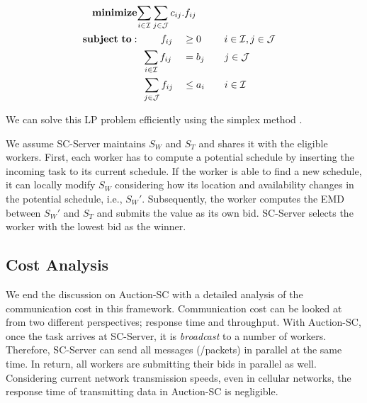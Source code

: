 \setcounter{equation}{0}
\begin{alignat}{2}
\mathbf{minimize}&\mathrlap{\sum_{i \in \mathcal{I}} \sum_{j \in \mathcal{J}} c_{ij}.f_{ij}} \notag\\
\mathbf{subject\ to:}&\phantom{{a}={a}} f_{ij} && \geq 0 \ \quad\quad i \in \mathcal{I}, j \in \mathcal{J}\\
&\phantom{{a}}\sum_{i \in \mathcal{I}} f_{ij} &&= b_j \quad\quad j \in \mathcal{J}\\
&\phantom{{a}}\sum_{j \in \mathcal{J}} f_{ij} &&\leq a_i \quad\quad i \in \mathcal{I}
\end{alignat}



\noindent We can solve this LP problem efficiently using the simplex method \cite{Dantzig90}.

We assume SC-Server maintains $S_W$ and $S_T$ and shares it with the eligible workers. First, each worker has to compute a potential schedule by inserting the incoming task to its current schedule. If the worker is able to find a new schedule, it can locally modify $S_W$ considering how its location and availability changes in the potential schedule, i.e., $S_{W}'$. Subsequently, the worker computes the EMD between $S_{W}'$ and $S_T$ and submits the value as its own bid. SC-Server selects the worker with the lowest bid as the winner.

\subsection{Cost Analysis}

We end the discussion on Auction-SC with a detailed analysis of the communication cost in this framework. Communication cost can be looked at from two different perspectives; response time and throughput. With Auction-SC, once the task arrives at SC-Server, it is \textit{broadcast} to a number of workers. Therefore, SC-Server can send all messages (/packets) in parallel at the same time. In return, all workers are submitting their bids in parallel as well. Considering current network transmission speeds, even in cellular networks, the response time of transmitting data in Auction-SC is negligible.

